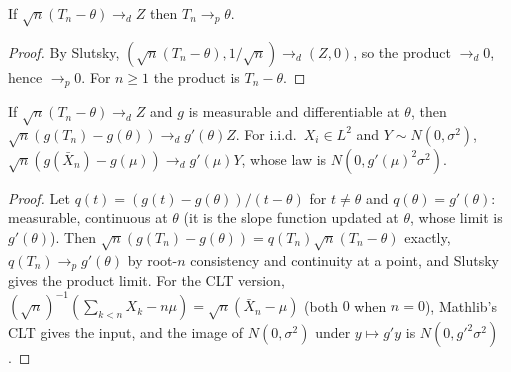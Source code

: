 \begin{theorem}
\label{thm:root-n}
\leanok
{}
If $\sqrt n(T_n-\theta)\to_dZ$ then $T_n\to_p\theta$.
\end{theorem}
\begin{proof}
\leanok
By Slutsky, $(\sqrt n(T_n-\theta), 1/\sqrt n)\to_d(Z,0)$, so the product $\to_d 0$, hence $\to_p0$. For $n\ge1$ the
product is $T_n-\theta$.
\end{proof}

\begin{theorem}
\label{thm:delta}
\leanok
{}
If $\sqrt n(T_n-\theta)\to_dZ$ and $g$ is measurable and differentiable at $\theta$, then
$\sqrt n(g(T_n)-g(\theta))\to_dg'(\theta)Z$. For i.i.d.\ $X_i\in L^2$ and $Y\sim N(0,\sigma^2)$,
$\sqrt n(g(\bar X_n)-g(\mu))\to_dg'(\mu)Y$, whose law is $N(0,g'(\mu)^2\sigma^2)$.
\end{theorem}
\begin{proof}
\leanok
Let $q(t) = (g(t)-g(\theta))/(t-\theta)$ for $t\ne\theta$ and $q(\theta) = g'(\theta)$: measurable, continuous at $\theta$
(it is the slope function updated at $\theta$, whose limit is $g'(\theta)$). Then
$\sqrt n(g(T_n)-g(\theta)) = q(T_n)\sqrt n(T_n-\theta)$ exactly, $q(T_n)\to_pg'(\theta)$ by root-$n$ consistency and
continuity at a point, and Slutsky gives the product limit. For the CLT version,
$(\sqrt n)^{-1}(\sum_{k<n}X_k - n\mu) = \sqrt n(\bar X_n-\mu)$ (both $0$ when $n = 0$), Mathlib's CLT gives the input,
and the image of $N(0,\sigma^2)$ under $y\mapsto g'y$ is $N(0,g'^2\sigma^2)$.
\end{proof}

